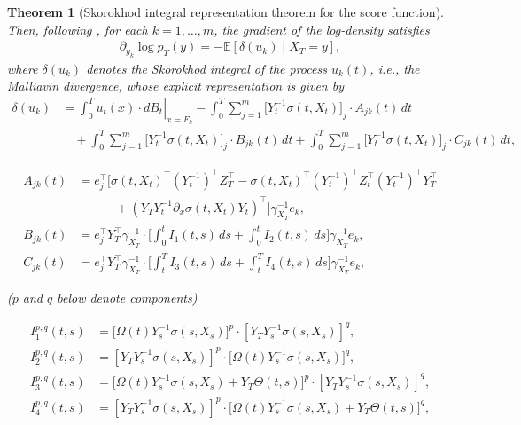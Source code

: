 \documentclass[]{interact}
\newcommand{\1}{\mathbf{1}}
\theoremstyle{plain}%
\newtheorem{theorem}{Theorem}[section]
\theoremstyle{definition}
\theoremstyle{remark}
\numberwithin{equation}{section}
\begin{document}
\begin{theorem}[Skorokhod integral representation theorem for the score function]
%
Then, following \cite{Nualart_Nualart_2018}, for each \( k = 1, \dots, m \), the gradient of the log-density satisfies
\begin{align}
\partial_{y_k} \log {p_T}(y) = -\mathbb{E} \left[ \delta(u_k) \mid X_T = y \right],
\label{score}
\end{align}
where \( \delta(u_k) \) denotes the Skorokhod integral of the process \( u_k(t) \), i.e., the Malliavin divergence, whose explicit representation is given by
\begin{align}
\delta(u_k) &= 
\left. \int_0^T u_t(x) \cdot dB_t \right|_{x=F_k}- \int_0^T \sum_{j=1}^m \bigl[ Y_t^{-1} \sigma(t, X_t) \bigr]_j \cdot A_{jk}(t) \, dt \nonumber\\
&\quad + \int_0^T \sum_{j=1}^m \bigl[ Y_t^{-1} \sigma(t, X_t) \bigr]_j \cdot B_{jk}(t) \, dt + \int_0^T \sum_{j=1}^m \bigl[ Y_t^{-1} \sigma(t, X_t) \bigr]_j \cdot C_{jk}(t) \, dt,
\label{score1}
\end{align}


\begin{align*}
A_{jk}(t) &= e_j^\top \bigg[ \sigma(t, X_t)^\top (Y_t^{-1})^\top Z_T^\top - \sigma(t, X_t)^\top (Y_t^{-1})^\top Z_t^\top (Y_t^{-1})^\top Y_T^\top \\
&\quad\quad\quad + \left( Y_T Y_t^{-1} \partial_x \sigma(t, X_t) Y_t \right)^\top \bigg] \gamma_{X_T}^{-1} e_k, \\[0.5em]
B_{jk}(t) &= e_j^\top Y_T^\top \gamma_{X_T}^{-1} \cdot \bigg[ \int_0^t I_1(t,s) \, ds + \int_0^t I_2(t,s) \, ds \bigg] \gamma_{X_T}^{-1} e_k,\\[0.5em]
C_{jk}(t) &= e_j^\top Y_T^\top \gamma_{X_T}^{-1} \cdot \bigg[ \int_t^T I_3(t,s) \, ds + \int_t^T I_4(t,s) \, ds \bigg] \gamma_{X_T}^{-1} e_k,
\end{align*}

 ($p$ and $q$ below denote components)

\begin{align*}
I^{p,q}_1(t,s) &= \bigg[ \Omega(t) Y_s^{-1}\sigma(s, X_s) \bigg]^p \cdot [Y_T Y_s^{-1} \sigma(s, X_s)]^q, \\[0.5em]
I^{p,q}_2(t,s) &= [Y_T Y_s^{-1} \sigma(s, X_s)]^p \cdot \bigg[ \Omega(t) Y_s^{-1}\sigma(s, X_s) \bigg]^q, \\[0.5em]
I^{p,q}_3(t,s) &= \bigg[ \Omega(t) Y_s^{-1}\sigma(s, X_s) + Y_T \Theta(t,s) \bigg]^p \cdot [Y_T Y_s^{-1} \sigma(s, X_s)]^q, \\[0.5em]
I^{p,q}_4(t,s) &= [Y_T Y_s^{-1} \sigma(s, X_s)]^p \cdot \bigg[ \Omega(t) Y_s^{-1}\sigma(s, X_s) + Y_T \Theta(t,s) \bigg]^q,
\end{align*}


\end{theorem}
\end{document}
